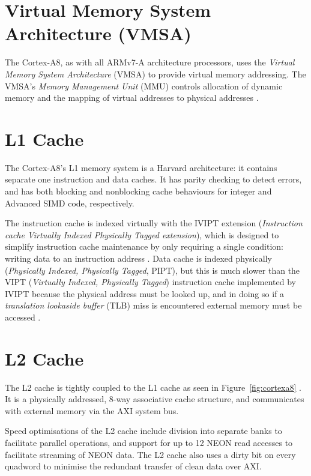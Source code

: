 \documentclass[oneside,a4paper]{report}
\begin{document}
\section{Virtual Memory System Architecture (VMSA)}
The Cortex-A8, as with all ARMv7-A architecture processors, uses the \emph{Virtual Memory System Architecture} (VMSA) to provide virtual memory addressing. The VMSA's \emph{Memory Management Unit} (MMU) controls allocation of dynamic memory and the mapping of virtual addresses to physical addresses \cite[p. B3-2]{ARMRef}.

\section{L1 Cache}

The Cortex-A8's L1 memory system is a Harvard architecture: it contains separate one instruction and data caches. It has parity checking to detect errors, and has both blocking and nonblocking cache behaviours for integer and Advanced SIMD code, respectively. \cite[p. 7-2]{A8Ref}

The instruction cache is indexed virtually with the IVIPT extension (\emph{Instruction cache Virtually Indexed Physically Tagged extension}), which is designed to simplify instruction cache maintenance by only requiring a single condition: writing data to an instruction address \cite[p. 7-4]{A8Ref}. Data cache is indexed physically (\emph{Physically Indexed, Physically Tagged}, PIPT), but this is much slower than the VIPT (\emph{Virtually Indexed, Physically Tagged}) instruction cache implemented by IVIPT because the physical address must be looked up, and in doing so if a \emph{translation lookaside buffer} (TLB) miss is encountered external memory must be accessed \cite[p. 7-8]{A8Ref}.

\section{L2 Cache}

The L2 cache is tightly coupled to the L1 cache as seen in Figure~\ref{fig:cortexa8} \cite[p. 8-2]{A8Ref}. It is a physically addressed, 8-way associative cache structure, and communicates with external memory via the AXI system bus.

Speed optimisations of the L2 cache include division into separate banks to facilitate parallel operations, and support for up to 12 NEON read accesses to facilitate streaming of NEON data. The L2 cache also uses a dirty bit on every quadword to minimise the redundant transfer of clean data over AXI.
\end{document}
